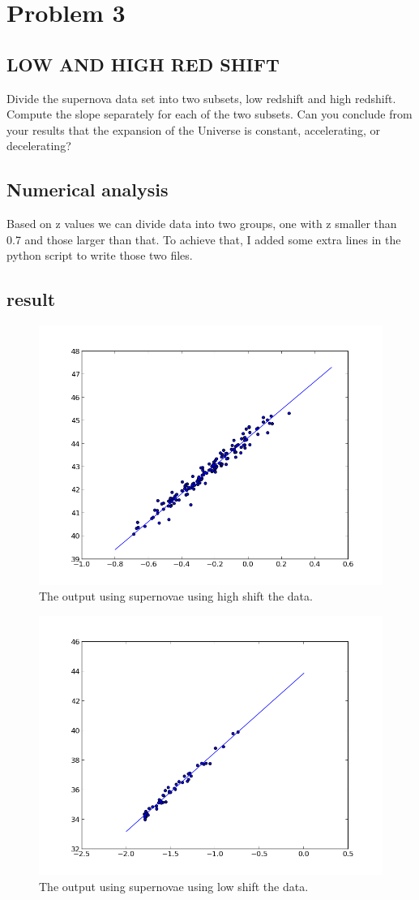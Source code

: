 \documentclass[11pt,letterpaper]{article}
\begin{document}
\section{Problem 3}
\subsection{LOW AND HIGH RED SHIFT}
Divide the supernova data set into two subsets, low redshift and high redshift. Compute the slope separately for each of the two subsets. Can you conclude from your results that the expansion of the Universe is constant, accelerating, or decelerating?
\subsection{Numerical analysis} 
Based on z values we can divide data into two groups, one with z smaller than 0.7 and those larger than that.
To achieve that, I added some extra lines in the python script to write those two files.
\subsection{result}

\begin{figure}
\begin{center}
\includegraphics[width=0.6\linewidth,angle=0]{supernovagt7.png}
\caption{The output using supernovae using high shift the data.}
\label{figure5}
\end{center}
\end{figure}

\begin{figure}
\begin{center}
\includegraphics[width=0.6\linewidth,angle=0]{supernovast7.png}
\caption{The output using supernovae using low shift the data.}
\label{figure6}
\end{center}
\end{figure}
\end{document}

